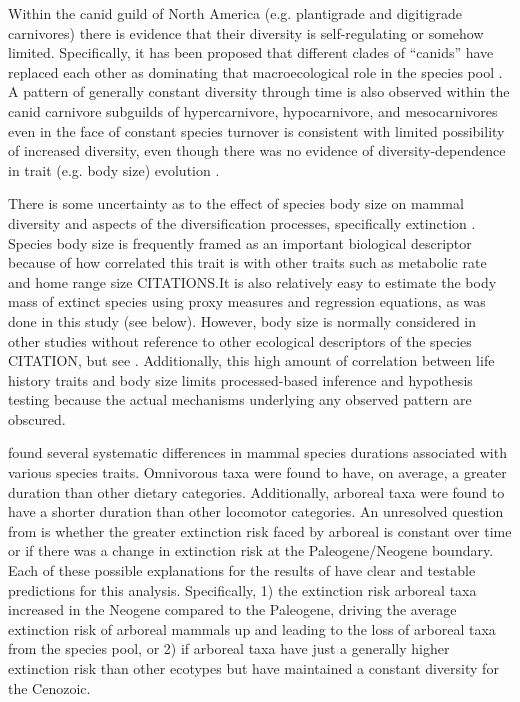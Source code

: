 \documentclass[12pt,letterpaper]{article}
\begin{document}
Within the canid guild of North America (e.g. plantigrade and digitigrade carnivores) there is evidence that their diversity is self-regulating or somehow limited. Specifically, it has been proposed that different clades of ``canids'' have replaced each other as dominating that macroecological role in the species pool \citep{Silvestro2015b}. A pattern of generally constant diversity through time is also observed within the canid carnivore subguilds of hypercarnivore, hypocarnivore, and mesocarnivores even in the face of constant species turnover is consistent with limited possibility of increased diversity, even though there was no evidence of diversity-dependence in trait (e.g. body size) evolution \citep{Slater2015c}.

There is some uncertainty as to the effect of species body size on mammal diversity and aspects of the diversification processes, specifically extinction \citep{Liow2008,Liow2009,Tomiya2013,Smits2015b}. Species body size is frequently framed as an important biological descriptor because of how correlated this trait is with other traits such as metabolic rate and home range size CITATIONS.It is also relatively easy to estimate the body mass of extinct species using proxy measures and regression equations, as was done in this study (see below). However, body size is normally considered in other studies without reference to other ecological descriptors of the species CITATION, but see \citep{Smits2015b}. Additionally, this high amount of correlation between life history traits and body size limits processed-based inference and hypothesis testing because the actual mechanisms underlying any observed pattern are obscured.

\citet{Smits2015b} found several systematic differences in mammal species durations associated with various species traits. Omnivorous taxa were found to have, on average, a greater duration than other dietary categories. Additionally, arboreal taxa were found to have a shorter duration than other locomotor categories. An unresolved question from \citet{Smits2015b} is whether the greater extinction risk faced by arboreal is constant over time or if there was a change in extinction risk at the Paleogene/Neogene boundary. Each of these possible explanations for the results of \citet{Smits2015b} have clear and testable predictions for this analysis. Specifically, 1) the extinction risk arboreal taxa increased in the Neogene compared to the Paleogene, driving the average extinction risk of arboreal mammals up and leading to the loss of arboreal taxa from the species pool, or 2) if arboreal taxa have just a generally higher extinction risk than other ecotypes but have maintained a constant diversity for the Cenozoic. 
\end{document}

